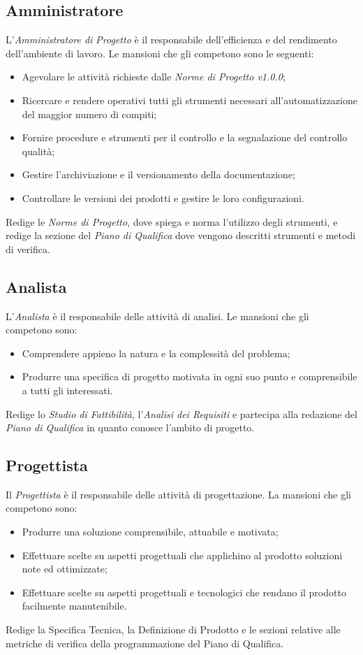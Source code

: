 \subsection{Amministratore}
L'\textit{Amministratore di Progetto} è il responsabile dell'efficienza e del rendimento dell'ambiente di lavoro. Le mansioni che gli competono sono le seguenti:
\begin{itemize}
	\item Agevolare le attività richieste dalle \textit{Norme di Progetto v1.0.0};
	\item Ricercare e rendere operativi tutti gli strumenti necessari all'automatizzazione del maggior numero di compiti;
	\item Fornire procedure e strumenti per il controllo e la segnalazione del controllo qualità;
	\item Gestire l'archiviazione e il versionamento della documentazione;
	\item Controllare le versioni dei prodotti e gestire le loro configurazioni.
\end{itemize}
Redige le \textit{Norme di Progetto}, dove spiega e norma l'utilizzo degli strumenti, e redige la sezione del \textit{Piano di Qualifica} dove vengono descritti strumenti e metodi di verifica.
\subsection{Analista}
L'\textit{Analista} è il responsabile delle attività di analisi. Le mansioni che gli competono sono:
\begin{itemize}
	\item Comprendere appieno la natura e la complessità del problema;
	\item Produrre una specifica di progetto motivata in ogni suo punto e comprensibile a tutti gli interessati.
\end{itemize}
Redige lo \textit{Studio di Fattibilità}, l'\textit{Analisi dei Requisiti} e partecipa alla redazione del \textit{Piano di Qualifica} in quanto conosce l'ambito di progetto.

\subsection{Progettista}
Il \textit{Progettista} è il responsabile delle attività di progettazione. La mansioni che gli competono sono:
\begin{itemize}
	\item Produrre una soluzione comprensibile, attuabile e motivata;
	\item Effettuare scelte su aspetti progettuali che applichino al prodotto soluzioni note ed ottimizzate;
	\item Effettuare scelte su aspetti progettuali e tecnologici che rendano il prodotto facilmente manutenibile.
\end{itemize}
Redige la Specifica Tecnica, la Definizione di Prodotto e le sezioni relative alle metriche di verifica della programmazione del Piano di Qualifica.

